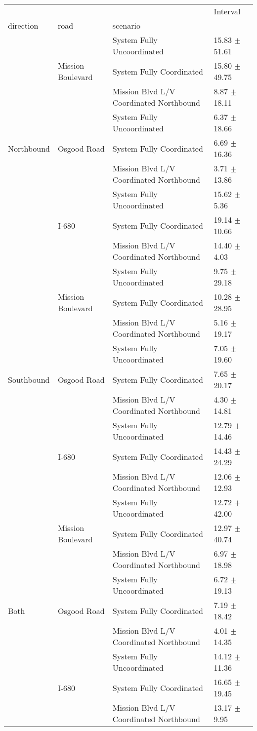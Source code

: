 \begin{tabular}{llll}
\toprule
 &  &  & Interval \\
direction & road & scenario &  \\
\midrule
\multirow[t]{9}{*}{Northbound} & \multirow[t]{3}{*}{Mission Boulevard} & System Fully Uncoordinated & 15.83 $\pm$ 51.61 \\
 &  & System Fully Coordinated & 15.80 $\pm$ 49.75 \\
 &  & Mission Blvd L/V Coordinated Northbound & 8.87 $\pm$ 18.11 \\
 & \multirow[t]{3}{*}{Osgood Road} & System Fully Uncoordinated & 6.37 $\pm$ 18.66 \\
 &  & System Fully Coordinated & 6.69 $\pm$ 16.36 \\
 &  & Mission Blvd L/V Coordinated Northbound & 3.71 $\pm$ 13.86 \\
 & \multirow[t]{3}{*}{I-680} & System Fully Uncoordinated & 15.62 $\pm$ 5.36 \\
 &  & System Fully Coordinated & 19.14 $\pm$ 10.66 \\
 &  & Mission Blvd L/V Coordinated Northbound & 14.40 $\pm$ 4.03 \\
\multirow[t]{9}{*}{Southbound} & \multirow[t]{3}{*}{Mission Boulevard} & System Fully Uncoordinated & 9.75 $\pm$ 29.18 \\
 &  & System Fully Coordinated & 10.28 $\pm$ 28.95 \\
 &  & Mission Blvd L/V Coordinated Northbound & 5.16 $\pm$ 19.17 \\
 & \multirow[t]{3}{*}{Osgood Road} & System Fully Uncoordinated & 7.05 $\pm$ 19.60 \\
 &  & System Fully Coordinated & 7.65 $\pm$ 20.17 \\
 &  & Mission Blvd L/V Coordinated Northbound & 4.30 $\pm$ 14.81 \\
 & \multirow[t]{3}{*}{I-680} & System Fully Uncoordinated & 12.79 $\pm$ 14.46 \\
 &  & System Fully Coordinated & 14.43 $\pm$ 24.29 \\
 &  & Mission Blvd L/V Coordinated Northbound & 12.06 $\pm$ 12.93 \\
\multirow[t]{9}{*}{Both} & \multirow[t]{3}{*}{Mission Boulevard} & System Fully Uncoordinated & 12.72 $\pm$ 42.00 \\
 &  & System Fully Coordinated & 12.97 $\pm$ 40.74 \\
 &  & Mission Blvd L/V Coordinated Northbound & 6.97 $\pm$ 18.98 \\
 & \multirow[t]{3}{*}{Osgood Road} & System Fully Uncoordinated & 6.72 $\pm$ 19.13 \\
 &  & System Fully Coordinated & 7.19 $\pm$ 18.42 \\
 &  & Mission Blvd L/V Coordinated Northbound & 4.01 $\pm$ 14.35 \\
 & \multirow[t]{3}{*}{I-680} & System Fully Uncoordinated & 14.12 $\pm$ 11.36 \\
 &  & System Fully Coordinated & 16.65 $\pm$ 19.45 \\
 &  & Mission Blvd L/V Coordinated Northbound & 13.17 $\pm$ 9.95 \\
\bottomrule
\end{tabular}

